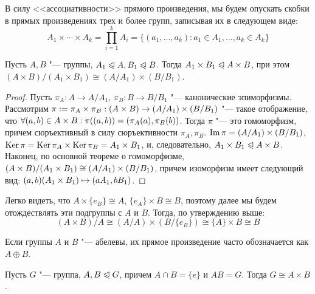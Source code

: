 \begin{note}
	В силу <<ассоциативности>> прямого произведения, мы будем опускать скобки в прямых произведениях трех и более групп, записывая их в следующем виде:
	\[A_1 \times \dotsb \times A_k = \prod_{i = 1}^kA_i = \{(a_1, \dotsc, a_k): a_1 \in A_1, \dotsc, a_k \in A_k\}\]
\end{note}

\begin{proposition}
	Пусть $A, B$ "--- группы, $A_1 \trianglelefteqslant A, B_1 \trianglelefteqslant B$. Тогда $A_1 \times B_1 \trianglelefteqslant A \times B$, при этом $(A \times B) / (A_1 \times B_1) \cong (A / A_1) \times (B / B_1)$.
\end{proposition}

\begin{proof}
	Пусть $\pi_A: A \to A/A_1$, $\pi_B: B \to B/B_1$ "--- канонические эпиморфизмы. Рассмотрим $\pi := \pi_A \times \pi_B: (A \times B) \hm\to (A / A_1) \times (B / B_1)$ "--- такое отображение, что $\forall (a, b) \hm\in A \times B: \pi((a, b)) = (\pi_A(a), \pi_B(b))$. Тогда $\pi$ "--- это гомоморфизм, причем сюръективный в силу сюръективности $\pi_A, \pi_B$. $\operatorname{Im}\pi = (A / A_1) \times (B / B_1)$, $\ke\pi \hm= \ke\pi_A \times \ke\pi_B = A_1 \times B_1$, и, следовательно, $A_1 \times B_1 \hm\normal A \times B$. Наконец, по основной теореме о гомоморфизме, $(A \hm\times B) / (A_1 \hm\times B_1) \hm\cong (A / A_1) \times (B / B_1)$, причем изоморфизм имеет следующий вид: $(a, b)(A_1 \hm\times B_1) \hm\mapsto (aA_1, bB_1)$.
\end{proof}

\begin{note}
	Легко видеть, что $A \times \{e_B\} \cong A$, $\{e_A\} \times B \cong B$, поэтому далее мы будем отождествлять эти подгруппы с $A$ и $B$. Тогда, по утверждению выше:
	\[(A \times B)/A \cong (A / A) \times (B / \{e_B\}) \cong \{A\} \times B \cong B\]
\end{note}

\begin{note}
	Если группы $A$ и $B$ "--- абелевы, их прямое произведение часто обозначается как $A \oplus B$.
\end{note}

\begin{theorem}
	Пусть $G$ "--- группа, $A, B \trianglelefteqslant G$, причем $A \cap B = \{e\}$ и $AB = G$. Тогда $G \cong A \times B$.
\end{theorem}

